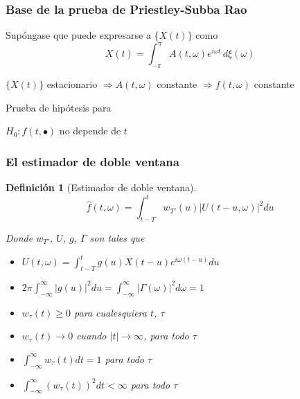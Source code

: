 \documentclass[serif,mathserif,professionalfont]{beamer}
\newtheorem{definicion}{Definición}
\newcommand{\est}[1]{\widehat{ #1 }}
\newcommand{\abso}[1]{\left| #1 \right|}
\begin{document}

\begin{frame}\frametitle{Base de la prueba de Priestley-Subba Rao}
Supóngase que puede expresarse a $\{X(t)\}$ como
\begin{equation*}
X(t) = \int_{-\pi}^{\pi} A(t,\omega) e^{i\omega t} \, d\xi(\omega)
\end{equation*}

\begin{center}
$\{ X(t) \}$ estacionario $\Rightarrow A(t,\omega)$ constante $\Rightarrow f(t,\omega)$ constante
\end{center}

\pause

Prueba de hipótesis para

\begin{center}
$H_0 : f(t,\bullet)$ no depende de $t$
\end{center}
\end{frame}


\begin{frame}\frametitle{El estimador de doble ventana}
\begin{definicion}[Estimador de doble ventana]
\begin{equation*}
\widehat{f}(t,\omega) = \int_{t-T}^{t} w_{T'}(u) \lvert U(t-u,\omega) \lvert^{2} du
\end{equation*}

Donde $w_{T'}$, $U$, $g$, $\Gamma$ son tales que
\begin{small}
\begin{itemize}
\item $U(t,\omega) = \int_{t-T}^{t} g(u) X({t-u}) e^{i \omega (t-u)} du$
\item $2\pi \int_{-\infty}^{\infty} \lvert g(u) \lvert^{2} du = 
\int_{-\infty}^{\infty} \lvert \Gamma(\omega) \lvert^{2} d\omega = 1$
\item $w_{\tau}(t) \geq 0$ para cualesquiera $t$, $\tau$
\item $w_{\tau}(t) \rightarrow 0$ cuando $\lvert t \lvert \rightarrow \infty$, para todo $\tau$
\item $\int_{-\infty}^{\infty} w_{\tau}(t) dt = 1$ para todo $\tau$
\item $ \int_{-\infty}^{\infty} \left( w_{\tau}(t) \right)^{2} dt < \infty$ para todo $\tau$
\end{itemize}
\end{small}
\end{definicion}
\end{frame}
\end{document}
